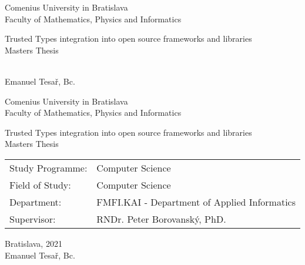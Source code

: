 \documentclass[12pt, twoside]{book}
\def\mfrok{2021}
\def\mfnazov{Trusted Types integration into open source frameworks and libraries}
\def\mftyp{Masters Thesis}
\def\mfautor{Emanuel Tesař, Bc.}
\def\mfskolitel{RNDr. Peter Borovanský, PhD.}
\def\mfmiesto{Bratislava, \mfrok}
\def\mfodbor{Computer Science}
\def\program{Computer Science}
\def\mfpracovisko{ FMFI.KAI - Department of Applied Informatics }
\begin{document}
\frontmatter


\thispagestyle{empty}

\begin{center}
  \sc\large
  Comenius University in Bratislava\\
  Faculty of Mathematics, Physics and Informatics

  \vfill

  {\LARGE\mfnazov}\\
  \mftyp
\end{center}

\vfill

{\sc\large
  \noindent \mfrok\\
  \mfautor
}

\cleardoublepage


\thispagestyle{empty}
\noindent

\begin{center}
  \sc
  \large
  Comenius University in Bratislava\\
  Faculty of Mathematics, Physics and Informatics

  \vfill

  {\LARGE\mfnazov}\\
  \mftyp
\end{center}

\vfill

\noindent
\begin{tabular}{ll}
  Study Programme: & \program      \\
  Field of Study:  & \mfodbor      \\
  Department:      & \mfpracovisko \\
  Supervisor:      & \mfskolitel   \\
\end{tabular}

\vfill


\noindent \mfmiesto\\
\mfautor

\cleardoublepage


\end{document}
